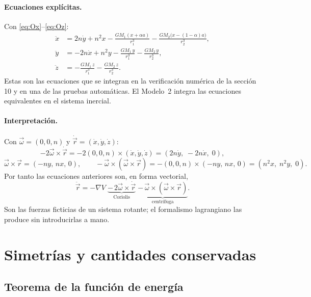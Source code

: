 \documentclass[12pt,letterpaper]{article}
\begin{document}
\paragraph{Ecuaciones explícitas.} Con \eqref{eq:Ox}--\eqref{eq:Oz}:
\begin{align*}
\ddot x &= 2n\dot y + n^2 x - \frac{GM_1(x+\alpha a)}{r_1^3} - \frac{GM_2\bigl(x-(1-\alpha)a\bigr)}{r_2^3},\\
\ddot y &= -2n\dot x + n^2 y - \frac{GM_1\, y}{r_1^3} - \frac{GM_2\, y}{r_2^3},\\
\ddot z &= - \frac{GM_1\, z}{r_1^3} - \frac{GM_2\, z}{r_2^3}.
\end{align*}
Estas son las ecuaciones que se integran en la verificación numérica de la sección 10 y en
una de las pruebas automáticas. El Modelo~2 integra las ecuaciones equivalentes en el sistema
inercial.

\paragraph{Interpretación.} Con $\vec\omega = (0,0,n)$ y $\dot{\vec r} = (\dot x,\dot y,\dot z)$:
\[
-2\vec\omega\times\dot{\vec r} = -2(0,0,n)\times(\dot x,\dot y,\dot z) = (2n\dot y,\; -2n\dot x,\; 0),
\]
\[
\vec\omega\times\vec r = (-ny,\, nx,\, 0), \qquad
-\vec\omega\times(\vec\omega\times\vec r) = -(0,0,n)\times(-ny,\,nx,\,0) = (n^2 x,\; n^2 y,\; 0).
\]
Por tanto las ecuaciones anteriores son, en forma vectorial,
\[
\ddot{\vec r} = -\nabla V \;\underbrace{-\,2\vec\omega\times\dot{\vec r}}_{\text{Coriolis}}
\;\underbrace{-\,\vec\omega\times(\vec\omega\times\vec r)}_{\text{centrífuga}} .
\]
Son las fuerzas ficticias de un sistema rotante; el formalismo lagrangiano las produce sin
introducirlas a mano.

\section{Simetrías y cantidades conservadas}

\subsection{Teorema de la función de energía}
\end{document}
